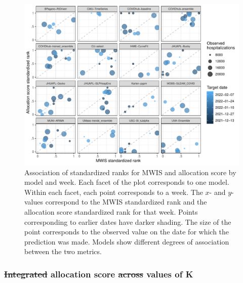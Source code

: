 \documentclass{article}\usepackage[]{graphicx}\usepackage[]{xcolor}
\makeatletter
\def\maxwidth{ %
  \ifdim\Gin@nat@width>\linewidth
    \linewidth
  \else
    \Gin@nat@width
  \fi
}
\newenvironment{knitrout}{}{} %
\providecommand{\DIFaddtex}[1]{{\protect\color{blue}\uwave{#1}}} %
\providecommand{\DIFdeltex}[1]{{\protect\color{red}\sout{#1}}}                      %
\providecommand{\DIFaddbegin}{} %
\providecommand{\DIFaddend}{} %
\providecommand{\DIFdelbegin}{} %
\providecommand{\DIFdelend}{} %
\providecommand{\DIFadd}[1]{\texorpdfstring{\DIFaddtex{#1}}{#1}} %
\providecommand{\DIFdel}[1]{\texorpdfstring{\DIFdeltex{#1}}{}} %
\newcommand{\DIFscaledelfig}{0.5}
\newlength{\DIFdelgraphicswidth} %
\newlength{\DIFdelgraphicsheight} %
\newcommand{\DIFaddincludegraphics}[2][]{{\color{blue}\fbox{\DIFOincludegraphics[#1]{#2}}}} %
\newcommand{\DIFdelincludegraphics}[2][]{%
\sbox{\DIFdelgraphicsbox}{\DIFOincludegraphics[#1]{#2}}%
\settoboxwidth{\DIFdelgraphicswidth}{\DIFdelgraphicsbox} %
\settoboxtotalheight{\DIFdelgraphicsheight}{\DIFdelgraphicsbox} %
\scalebox{\DIFscaledelfig}{%
\parbox[b]{\DIFdelgraphicswidth}{\usebox{\DIFdelgraphicsbox}\\[-\baselineskip] \rule{\DIFdelgraphicswidth}{0em}}\llap{\resizebox{\DIFdelgraphicswidth}{\DIFdelgraphicsheight}{%
\setlength{\unitlength}{\DIFdelgraphicswidth}%
\begin{picture}(1,1)%
\thicklines\linethickness{2pt} %
{\color[rgb]{1,0,0}\put(0,0){\framebox(1,1){}}}%
{\color[rgb]{1,0,0}\put(0,0){\line( 1,1){1}}}%
{\color[rgb]{1,0,0}\put(0,1){\line(1,-1){1}}}%
\end{picture}%
}\hspace*{3pt}}} %
} %
\DeclareRobustCommand{\DIFaddbegin}{\DIFOaddbegin \let\includegraphics\DIFaddincludegraphics} %
\DeclareRobustCommand{\DIFaddend}{\DIFOaddend \let\includegraphics\DIFOincludegraphics} %
\DeclareRobustCommand{\DIFdelbegin}{\DIFOdelbegin \let\includegraphics\DIFdelincludegraphics} %
\DeclareRobustCommand{\DIFdelend}{\DIFOaddend \let\includegraphics\DIFOincludegraphics} %
\makeatother
\begin{document}
\begin{knitrout}
\color{fgcolor}\begin{figure}[H]
\includegraphics[width=\maxwidth]{figure/metrics-correlation-1} \caption[Association of standardized ranks for MWIS and allocation score by model and week]{Association of standardized ranks for MWIS and allocation score by model and week. Each facet of the plot corresponds to one model. Within each facet, each point corresponds to a week. The $x$- and $y$-values correspond to the MWIS standardized rank and the allocation score standardized rank for that week. Points corresponding to earlier dates have darker shading. The size of the point corresponds to the observed value on the date for which the prediction was made. Models show different degrees of association between the two metrics.}\label{fig:metrics-correlation}
\end{figure}

\end{knitrout}



\subsubsection{\DIFdelbegin \DIFdel{Integrated }\DIFdelend \DIFaddbegin \DIFadd{Sensitivity of }\DIFaddend allocation score \DIFdelbegin \DIFdel{across }\DIFdelend \DIFaddbegin \DIFadd{to }\DIFaddend values of K}
\DIFdelbegin %
\DIFdelend \DIFaddbegin \label{sec:sensitivity}
\DIFaddend 
\end{document}
